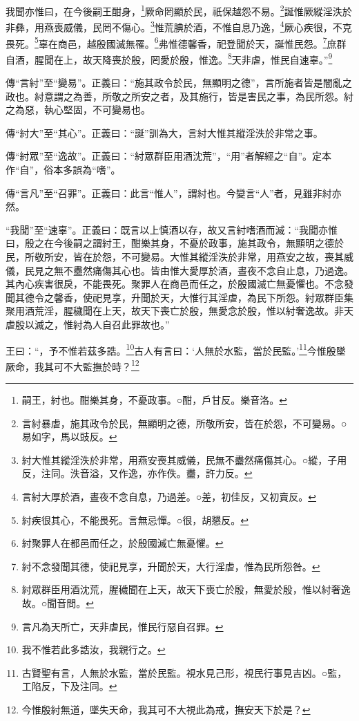 我聞亦惟曰，在今後嗣王酣身，\footnote{嗣王，紂也。酣樂其身，不憂政事。○酣，戶甘反。樂音洛。}厥命罔顯於民，祇保越怨不易。\footnote{言紂暴虐，施其政令於民，無顯明之德，所敬所安，皆在於怨，不可變易。○易如字，馬以豉反。}誕惟厥縱淫泆於非彝，用燕喪威儀，民罔不傷心。\footnote{紂大惟其縱淫泆於非常，用燕安喪其威儀，民無不衋然痛傷其心。○縱，子用反，注同。泆音溢，又作逸，亦作佚。衋，許力反。}惟荒腆於酒，不惟自息乃逸，\footnote{言紂大厚於酒，晝夜不念自息，乃過差。○差，初佳反，又初賣反。}厥心疾很，不克畏死。\footnote{紂疾很其心，不能畏死。言無忌憚。○很，胡懇反。}辜在商邑，越殷國滅無罹。\footnote{紂聚罪人在都邑而任之，於殷國滅亡無憂懼。}弗惟德馨香，祀登聞於天，誕惟民怨。\footnote{紂不念發聞其德，使祀見享，升聞於天，大行淫虐，惟為民所怨咎。}庶群自酒，腥聞在上，故天降喪於殷，罔愛於殷，惟逸。\footnote{紂眾群臣用酒沈荒，腥穢聞在上天，故天下喪亡於殷，無愛於殷，惟以紂奢逸故。○聞音問。}天非虐，惟民自速辜。”\footnote{言凡為天所亡，天非虐民，惟民行惡自召罪。}


{\noindent\zhuan{}\fzbyks 傳“言紂”至“變易”。正義曰：“施其政令於民，無顯明之德”，言所施者皆是闇亂之政也。紂意謂之為善，所敬之所安之者，及其施行，皆是害民之事，為民所怨。紂之為惡，執心堅固，不可變易也。 \par}

{\noindent\zhuan{}\fzbyks 傳“紂大”至“其心”。正義曰：“誕”訓為大，言紂大惟其縱淫泆於非常之事。 \par}

{\noindent\zhuan{}\fzbyks 傳“紂眾”至“逸故”。正義曰：“紂眾群臣用酒沈荒”，“用”者解經之“自”。定本作“自”，俗本多誤為“嗜”。 \par}

{\noindent\zhuan{}\fzbyks 傳“言凡”至“召罪”。正義曰：此言“惟人”，謂紂也。今變言“人”者，見雖非紂亦然。 \par}

{\noindent\shu{}\fzkt “我聞”至“速辜”。正義曰：既言以上慎酒以存，故又言紂嗜酒而滅：“我聞亦惟曰，殷之在今後嗣之謂紂王，酣樂其身，不憂於政事，施其政令，無顯明之德於民，所敬所安，皆在於怨，不可變易。大惟其縱淫泆於非常，用燕安之故，喪其威儀，民見之無不衋然痛傷其心也。皆由惟大愛厚於酒，晝夜不念自止息，乃過逸。其內心疾害很戾，不能畏死。聚罪人在商邑而任之，於殷國滅亡無憂懼也。不念發聞其德令之馨香，使祀見享，升聞於天，大惟行其淫虐，為民下所怨。紂眾群臣集聚用酒荒淫，腥穢聞在上天，故天下喪亡於殷，無愛念於殷，惟以紂奢逸故。非天虐殷以滅之，惟紂為人自召此罪故也。” \par}

王曰：“，予不惟若茲多誥。\footnote{我不惟若此多誥汝，我親行之。}古人有言曰：‘人無於水監，當於民監。’\footnote{古賢聖有言，人無於水監，當於民監。視水見己形，視民行事見吉凶。○監，工陷反，下及注同。}今惟殷墜厥命，我其可不大監撫於時？\footnote{今惟殷紂無道，墜失天命，我其可不大視此為戒，撫安天下於是？}

